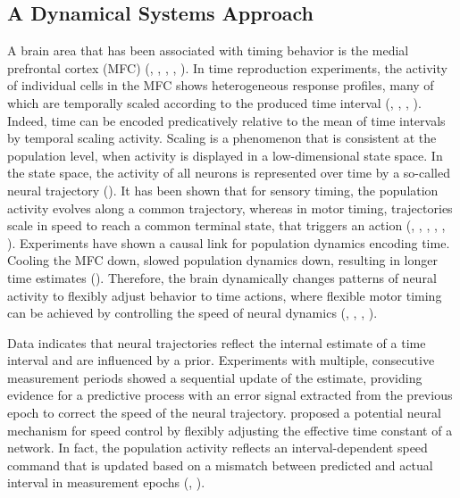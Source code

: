 \documentclass[10pt]{article}
\begin{document}

\subsection{A Dynamical Systems Approach}
A brain area that has been associated with timing behavior is the medial prefrontal cortex (MFC) (\cite{Wang2018}, \cite{Emmons2017}, \cite{Genovesio2006}, \cite{Lewis2004}, \cite{Shima2000}).
In time reproduction experiments, the activity of individual cells in the MFC shows heterogeneous response profiles, many of which are temporally scaled according to the produced time interval (\cite{Henke2021}, \cite{Sohn2019}, \cite{Remington2018}, \cite{Wang2018}).
Indeed, time can be encoded predicatively relative to the mean of time intervals by temporal scaling activity.
Scaling is a phenomenon that is consistent at the population level, when activity is displayed in a low-dimensional state space. In the state space, the activity of all neurons is represented over time by a so-called neural trajectory (\cite{Cueva2022}).
It has been shown that for sensory timing, the population activity evolves along a common trajectory, whereas in motor timing, trajectories scale in speed to reach a common terminal state, that triggers an action (\cite{Henke2021}, \cite{Meirhaeghe2021}, \cite{Sohn2019}, \cite{Wang2018}, \cite{Murakami2014}, \cite{Mita2009}).
Experiments have shown a causal link for population dynamics encoding time. Cooling the MFC down, slowed population dynamics down, resulting in longer time estimates (\cite{Xu2014}). 
Therefore, the brain dynamically changes patterns of neural activity to flexibly adjust behavior to time actions, where flexible motor timing can be achieved by controlling the speed of neural dynamics (\cite{Tsao2022}, \cite{Sohn2019}, \cite{Remington2018}, \cite{Wang2018}).

Data indicates that neural trajectories reflect the internal estimate of a time interval and are influenced by a prior.
Experiments with multiple, consecutive measurement periods showed a sequential update of the estimate, providing evidence for a predictive process with an error signal extracted from the previous epoch to correct the speed of the neural trajectory.
\cite{Wang2018} proposed a potential neural mechanism for speed control by flexibly adjusting the effective time constant of a network.
In fact, the population activity reflects an interval-dependent speed command that is updated based on a mismatch between predicted and actual interval in measurement epochs (\cite{Egger2019}, \cite{Wang2018}). 
\end{document}
